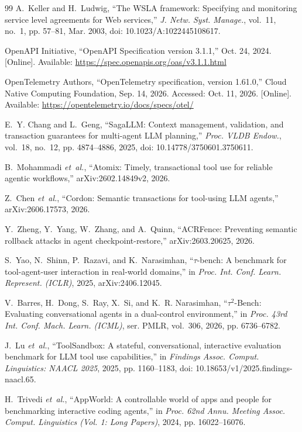 \documentclass[10pt,journal,compsoc]{IEEEtran}
\begin{document}
\begin{thebibliography}{99}
A.~Keller and H.~Ludwig, ``The WSLA framework: Specifying and monitoring service level agreements for Web services,'' \emph{J. Netw. Syst. Manage.}, vol.~11, no.~1, pp. 57--81, Mar. 2003, doi: 10.1023/A:1022445108617.

OpenAPI Initiative, ``OpenAPI Specification version 3.1.1,'' Oct. 24, 2024. [Online]. Available: \url{https://spec.openapis.org/oas/v3.1.1.html}

OpenTelemetry Authors, ``OpenTelemetry specification, version 1.61.0,'' Cloud Native Computing Foundation, Sep. 14, 2026. Accessed: Oct. 11, 2026. [Online]. Available: \url{https://opentelemetry.io/docs/specs/otel/}

E.~Y. Chang and L.~Geng, ``SagaLLM: Context management, validation, and transaction guarantees for multi-agent LLM planning,'' \emph{Proc. VLDB Endow.}, vol.~18, no.~12, pp. 4874--4886, 2025, doi: 10.14778/3750601.3750611.

B.~Mohammadi \emph{et~al.}, ``Atomix: Timely, transactional tool use for reliable agentic workflows,'' arXiv:2602.14849v2, 2026.

Z.~Chen \emph{et~al.}, ``Cordon: Semantic transactions for tool-using LLM agents,'' arXiv:2606.17573, 2026.

Y.~Zheng, Y.~Yang, W.~Zhang, and A.~Quinn, ``ACRFence: Preventing semantic rollback attacks in agent checkpoint-restore,'' arXiv:2603.20625, 2026.

S.~Yao, N.~Shinn, P.~Razavi, and K.~Narasimhan, ``$\tau$-bench: A benchmark for tool-agent-user interaction in real-world domains,'' in \emph{Proc. Int. Conf. Learn. Represent. (ICLR)}, 2025, arXiv:2406.12045.

V.~Barres, H.~Dong, S.~Ray, X.~Si, and K.~R. Narasimhan, ``$\tau^2$-Bench: Evaluating conversational agents in a dual-control environment,'' in \emph{Proc. 43rd Int. Conf. Mach. Learn. (ICML)}, ser. PMLR, vol.~306, 2026, pp. 6736--6782.

J.~Lu \emph{et~al.}, ``ToolSandbox: A stateful, conversational, interactive evaluation benchmark for LLM tool use capabilities,'' in \emph{Findings Assoc. Comput. Linguistics: NAACL 2025}, 2025, pp. 1160--1183, doi: 10.18653/v1/2025.findings-naacl.65.

H.~Trivedi \emph{et~al.}, ``AppWorld: A controllable world of apps and people for benchmarking interactive coding agents,'' in \emph{Proc. 62nd Annu. Meeting Assoc. Comput. Linguistics (Vol. 1: Long Papers)}, 2024, pp. 16022--16076.


\end{thebibliography}
\end{document}
